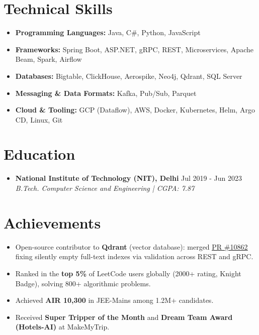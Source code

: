 \documentclass[a4paper,11pt]{article}
\newcommand{\resumeExp}[4]{
    \item
    {\normalsize\textbf{#1}} \hfill #3 \\
    \textit{#2} \hfill \textit{#4}
}
\newcommand{\resumeEdu}[4]{\resumeExp{#1}{#2}{#3}{#4}}
\newcommand{\resumeAchievement}[1]{
    \item[$\bullet$] #1
}
\newcommand{\resumeSkill}[2]{
    \item \textbf{#1} #2
}
\newcommand{\resumeSectionStart}[1]{
    \section{#1}
}
\newcommand{\resumeSectionEnd}{}
\newcommand{\resumeSubSectionListStart}{\begin{itemize}[leftmargin=0pt, label={}, itemsep=1pt, topsep=0pt, parsep=0pt, partopsep=0pt]\small}
\newcommand{\resumeSubSectionListEnd}{\end{itemize}}
\newcommand{\resumeItemListStart}{\begin{itemize}[leftmargin=1.4em, labelsep=0.5em, itemsep=1pt, topsep=1pt, parsep=0pt, partopsep=0pt]\small}
\newcommand{\resumeItemListEnd}{\end{itemize}\vspace{3pt}}
\newcommand{\qdrantPrLink}{https://github.com/qdrant/qdrant/pull/10862}
\begin{document}
\resumeSectionStart{Technical Skills}
\resumeSubSectionListStart
\resumeSkill{Programming Languages:}{Java, C\#, Python, JavaScript}
\resumeSkill{Frameworks:}{Spring Boot, ASP.NET, gRPC, REST, Microservices, Apache Beam, Spark, Airflow}
\resumeSkill{Databases:}{Bigtable, ClickHouse, Aerospike, Neo4j, Qdrant, SQL Server}
\resumeSkill{Messaging \& Data Formats:}{Kafka, Pub/Sub, Parquet}
\resumeSkill{Cloud \& Tooling:}{GCP (Dataflow), AWS, Docker, Kubernetes, Helm, Argo CD, Linux, Git}
\resumeSubSectionListEnd
\resumeSectionEnd


\resumeSectionStart{Education}
\resumeSubSectionListStart
\resumeEdu
{National Institute of Technology (NIT), Delhi}
{B.Tech. Computer Science and Engineering | CGPA: 7.87}
{Jul 2019 - Jun 2023}
{}
\resumeSubSectionListEnd
\resumeSectionEnd


\resumeSectionStart{Achievements}
\resumeItemListStart
\resumeAchievement{Open-source contributor to \textbf{Qdrant} (vector database): merged \href{\qdrantPrLink}{\underline{PR \#10862}} fixing silently empty full-text indexes via validation across REST and gRPC.}
\resumeAchievement{Ranked in the \textbf{top 5\%} of LeetCode users globally (2000+ rating, Knight Badge), solving 800+ algorithmic problems.}
\resumeAchievement{Achieved \textbf{AIR 10,300} in JEE-Mains among 1.2M+ candidates.}
\resumeAchievement{Received \textbf{Super Tripper of the Month} and \textbf{Dream Team Award (Hotels-AI)} at MakeMyTrip.}
\resumeItemListEnd
\resumeSectionEnd
\end{document}
